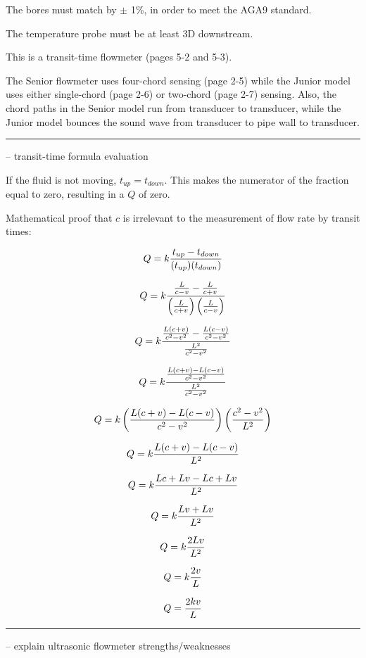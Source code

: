 \vskip 10pt

The bores must match by $\pm$ 1\%, in order to meet the AGA9 standard.

\vskip 10pt

The temperature probe must be at least 3D downstream.

\vskip 10pt

This is a transit-time flowmeter (pages 5-2 and 5-3).

\vskip 10pt

The Senior flowmeter uses four-chord sensing (page 2-5) while the Junior model uses either single-chord (page 2-6) or two-chord (page 2-7) sensing.  Also, the chord paths in the Senior model run from transducer to transducer, while the Junior model bounces the sound wave from transducer to pipe wall to transducer.


\filbreak \vskip 5pt \hrule \vskip 5pt  -- transit-time formula evaluation \vskip 10pt

If the fluid is not moving, $t_{up} = t_{down}$.  This makes the numerator of the fraction equal to zero, resulting in a $Q$ of zero.

\vskip 10pt

Mathematical proof that $c$ is irrelevant to the measurement of flow rate by transit times:

$$Q = k {t_{up} - t_{down} \over (t_{up})(t_{down})}$$

$$Q = k {{L \over c-v} - {L \over c+v} \over \left({L \over c+v}\right)  \left({L \over c-v}\right)}$$

$$Q = k {{L (c + v) \over c^2 - v^2} - {L (c - v) \over c^2 - v^2} \over {L^2 \over c^2 - v^2}}$$

$$Q = k {{L (c + v) - L (c - v) \over c^2 - v^2} \over {L^2 \over c^2 - v^2}}$$

$$Q = k \left({L (c + v) - L (c - v) \over c^2 - v^2}\right) \left({c^2 - v^2 \over L^2}\right) $$

$$Q = k {L (c + v) - L (c - v) \over L^2}$$

$$Q = k {Lc + Lv - Lc + Lv \over L^2}$$

$$Q = k {Lv + Lv \over L^2}$$

$$Q = k {2Lv \over L^2}$$

$$Q = k {2v \over L}$$

$$Q = {2kv \over L}$$


\filbreak \vskip 5pt \hrule \vskip 5pt  -- explain ultrasonic flowmeter strengths/weaknesses \vskip 10pt

